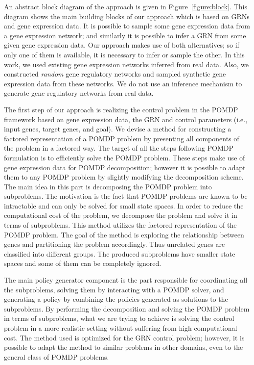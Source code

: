 An abstract block diagram of the approach is given in Figure~\ref{figure:block}. This diagram shows the main
building blocks of our approach which is based on GRNs and gene expression data. It is possible to sample
some gene expression data from a gene expression network; and similarly it is possible to infer a GRN from
some given gene expression data. Our approach makes use of both alternatives; so if only one of them is
available, it is necessary to infer or sample the other. In this work, we used existing gene expression networks inferred from real data. Also, we constructed \emph{random} gene regulatory networks and sampled synthetic gene expression data from these networks. We do not use an inference mechanism to generate gene regulatory networks from real data.

The first step of our approach is realizing the control problem in the POMDP framework based on gene
expression data, the GRN and control parameters (i.e., input genes, target genes, and goal). We devise a
method for constructing a factored representation of a POMDP problem by presenting all components of the
problem in a factored way. The target of all the steps following POMDP formulation is to efficiently solve
the POMDP problem. These steps make use of gene expression data for POMDP decomposition; however it is
possible to adapt them to any POMDP problem by slightly modifying the decomposition scheme. The main idea in
this part is decomposing the POMDP problem into subproblems. The motivation is the fact that POMDP problems
are known to be intractable and can only be solved for small state spaces. In order to reduce the
computational cost of the problem, we decompose the problem and solve it in terms of subproblems. This method
utilizes the factored representation of the POMDP problem. The goal of the method is exploring the
relationship between genes and partitioning the problem accordingly. Thus unrelated genes are classified into
different groups. The produced subproblems have smaller state spaces and some of them can be completely
ignored.

The main policy generator component is the part responsible for coordinating all the subproblems, solving
them by interacting with a POMDP solver, and generating a policy by combining the policies generated as
solutions to the subproblems. By performing the decomposition and solving the POMDP problem in terms of
subproblems, what we are trying to achieve is solving the control problem in a more realistic setting without
suffering from high computational cost. The method used is optimized for the GRN control problem; however, it
is possible to adapt the method to similar problems in other domains, even to the general class of POMDP
problems.

